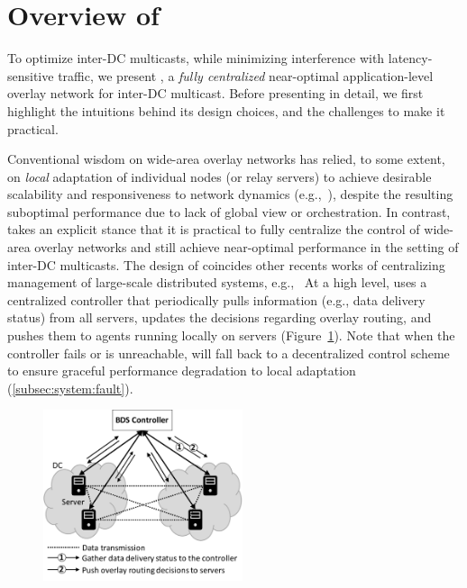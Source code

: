 \section{Overview of \name}
\label{sec:overview}

To optimize inter-DC multicasts, while minimizing interference with 
latency-sensitive traffic, we present {\em \name}, a {\em fully centralized} 
near-optimal application-level overlay network for inter-DC multicast. 
Before presenting \name in detail, we first highlight the intuitions 
behind its design choices, and the challenges to make it practical.


Conventional wisdom on wide-area overlay networks has relied, to 
some extent, on {\em local} adaptation of individual nodes (or 
relay servers) to achieve desirable scalability and responsiveness 
to network dynamics 
(e.g.,~\cite{Andreev2013Designing,Repantis2010Scaling,Huang2014A,mukerjee2014enabling}),
despite the resulting suboptimal performance due to lack of global 
view or orchestration. 
In contrast, \name takes an explicit stance that it is practical to 
fully centralize the control of wide-area overlay networks and 
still achieve near-optimal performance in the setting of inter-DC 
multicasts. The design of \name coincides other recents works of centralizing
management of large-scale distributed systems, e.g.,~\cite{gog2016firmament}
At a high level, \name uses a centralized controller that 
periodically pulls information (e.g., data delivery status) from all 
servers, updates the decisions regarding overlay routing, and pushes 
them to agents running locally on servers 
(Figure~\ref{fig:framework}).
Note that when the controller fails or is unreachable, \name will 
fall back to a decentralized control scheme to ensure graceful 
performance degradation to local adaptation 
(\Section\ref{subsec:system:fault}).

\begin{figure}[t]
  \centering
  \includegraphics[width=2.3in]{images/framework-new.pdf}
    \vspace{-0.2cm}
  \label{fig:framework}
\vspace{-0.4cm}
\end{figure}

